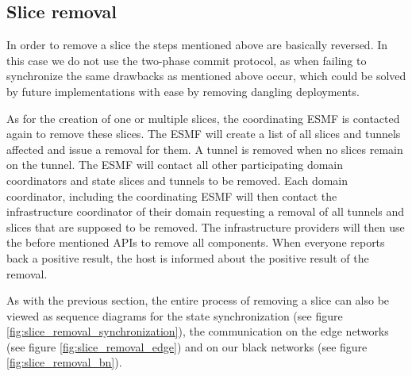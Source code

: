 \subsection{Slice removal}
In order to remove a slice the steps mentioned above are basically reversed. In this case we do not use the two-phase commit protocol, as when failing to synchronize the same drawbacks as mentioned above occur, which could be solved by future implementations with ease by removing dangling deployments.

As for the creation of one or multiple slices, the coordinating ESMF is contacted again to remove these slices. The ESMF will create a list of all slices and tunnels affected and issue a removal for them. A tunnel is removed when no slices remain on the tunnel. The ESMF will contact all other participating domain coordinators and state slices and tunnels to be removed. Each domain coordinator, including the coordinating ESMF will then contact the infrastructure coordinator of their domain requesting a removal of all tunnels and slices that are supposed to be removed. The infrastructure providers will then use the before mentioned APIs to remove all components. When everyone reports back a positive result, the host is informed about the positive result of the removal.

As with the previous section, the entire process of removing a slice can also be viewed as sequence diagrams for the state synchronization (see figure \ref{fig:slice_removal_synchronization}), the communication on the edge networks (see figure \ref{fig:slice_removal_edge}) and on our black networks (see figure \ref{fig:slice_removal_bn}).

